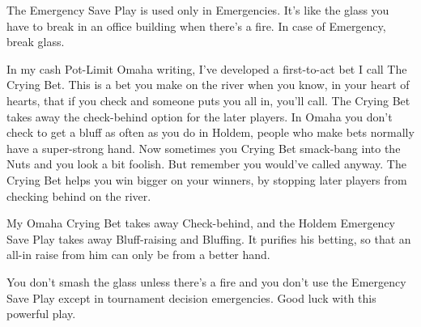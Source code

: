 The Emergency Save Play is used only in Emergencies. It's like the
glass you have to break in an office building when there's a fire. In
case of Emergency, break glass.

In my cash Pot-Limit Omaha writing, I've developed a first-to-act bet
I call The Crying Bet. This is a bet you make on the river when you
know, in your heart of hearts, that if you check and someone puts you
all in, you'll call. The Crying Bet takes away the check-behind option
for the later players. In Omaha you don't check to get a bluff as
often as you do in Holdem, people who make bets normally have a
super-strong hand. Now sometimes you Crying Bet smack-bang into the
Nuts and you look a bit foolish. But remember you would've called
anyway. The Crying Bet helps you win bigger on your winners, by
stopping later players from checking behind on the river.

My Omaha Crying Bet takes away Check-behind, and the Holdem
Emergency Save Play takes away Bluff-raising and Bluffing. It purifies
his betting, so that an all-in raise from him can only be from a
better hand.

You don't smash the glass unless there's a fire and you don't use the
Emergency Save Play except in tournament decision emergencies. Good
luck with this powerful play.
